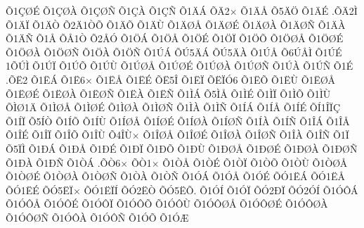 {^^d51^^c7^^d8^^c9
^^d51^^c7^^d8^^c0
^^d51^^c7^^d8^^d1
^^d51^^c7^^c0
^^d51^^c7^^d1
^^d51^^c4^^c1
^^d5^^c42^^d7
^^d51^^c4^^c5
^^d55^^c4^^d6
^^d51^^c4^^c9
.^^d5^^c42^^cc
^^d51^^c4^^cf
^^d51^^c4^^d2
^^d52^^c41^^d2^^d5
^^d51^^c4^^d5
^^d51^^c4^^d9
^^d51^^c4^^d8^^c5
^^d51^^c4^^d8^^c9
^^d51^^c4^^d8^^c0
^^d51^^c4^^d8^^d1
^^d51^^c4^^c0
^^d51^^c4^^d1
^^d51^^c5
^^d5^^c51^^d2
^^d52^^c5^^d3
^^d51^^d6^^c1
^^d51^^d6^^c5
^^d51^^d6^^c9
^^d51^^d6^^cf
^^d51^^d6^^d5
^^d51^^d6^^d8^^c5
^^d51^^d6^^d8^^c9
^^d51^^d6^^d8^^c0
^^d51^^d6^^d8^^d1
^^d51^^d6^^c0
^^d51^^d6^^d1
^^d51^^da^^c1
^^d5^^da5^^c4^^c1
^^d5^^da5^^c4^^c0
^^d51^^da^^c5
^^d56^^da^^c5^^cc
^^d51^^da^^c9
1^^d5^^da^^cc
^^d51^^da^^cf
^^d51^^da^^d5
^^d51^^da^^d9
^^d51^^da^^d8^^c5
^^d51^^da^^d8^^c9
^^d51^^da^^d8^^c0
^^d51^^da^^d8^^d1
^^d51^^da^^c0
^^d51^^da^^d1
^^d51^^c9
.^^d5^^cb2
^^d51^^cb^^c1
^^d51^^cb6^^d7
^^d51^^cb^^c5
^^d51^^cb^^c9
^^d5^^cb5^^ce
^^d51^^cb^^cf
^^d5^^cb^^cf^^d36
^^d51^^cb^^d5
^^d51^^cb^^d9
^^d51^^cb^^d8^^c5
^^d51^^cb^^d8^^c9
^^d51^^cb^^d8^^c0
^^d51^^cb^^d8^^d1
^^d51^^cb^^c0
^^d51^^cb^^d1
^^d51^^cc^^c1
^^d55^^cc^^c5
^^d51^^cc^^c9
^^d51^^cc^^cf
^^d51^^cc^^d5
^^d51^^cc^^d9
^^d5^^cc^^d81^^c4
^^d51^^cc^^d8^^c5
^^d51^^cc^^d8^^c9
^^d51^^cc^^d8^^c0
^^d51^^cc^^d8^^d1
^^d51^^cc^^c0
^^d51^^cc^^d1
^^d51^^cd^^c1
^^d51^^cd^^c5
^^d51^^cd^^c9
^^d5^^cd1^^ce^^cf^^c7
^^d51^^cd^^cf
^^d55^^cd^^d2
^^d51^^cd^^d5
^^d51^^cd^^d9
^^d51^^cd^^d8^^c5
^^d51^^cd^^d8^^c9
^^d51^^cd^^d8^^c0
^^d51^^cd^^d8^^d1
^^d51^^cd^^c0
^^d51^^cd^^d1
^^d51^^ce^^c1
^^d51^^ce^^c5
^^d51^^ce^^c9
^^d51^^ce^^cf
^^d51^^ce^^d5
^^d51^^ce^^d9
^^d54^^ce^^d9^^d7
^^d51^^ce^^d8^^c5
^^d51^^ce^^d8^^c9
^^d51^^ce^^d8^^c0
^^d51^^ce^^d8^^d1
^^d51^^ce^^c0
^^d51^^ce^^d1
^^d51^^cf
^^d55^^cf^^cc
^^d51^^d0^^c1
^^d51^^d0^^c5
^^d51^^d0^^c9
^^d51^^d0^^cf
^^d51^^d0^^d5
^^d51^^d0^^d9
^^d51^^d0^^d8^^c5
^^d51^^d0^^d8^^c9
^^d51^^d0^^d8^^c0
^^d51^^d0^^d8^^d1
^^d51^^d0^^c0
^^d51^^d0^^d1
^^d51^^d2^^c1
.^^d5^^d26^^d7
^^d5^^d21^^d7
^^d51^^d2^^c5
^^d51^^d2^^c9
^^d51^^d2^^cf
^^d51^^d2^^d5
^^d51^^d2^^d9
^^d51^^d2^^d8^^c5
^^d51^^d2^^d8^^c9
^^d51^^d2^^d8^^c0
^^d51^^d2^^d8^^d1
^^d51^^d2^^c0
^^d51^^d2^^d1
^^d51^^d3^^c1
^^d51^^d3^^c5
^^d51^^d3^^c9
^^d5^^d31^^cb^^c1
^^d5^^d31^^cb^^c5
^^d5^^d31^^cb^^c9
^^d5^^d35^^cb^^cf^^d7
^^d5^^d31^^cb^^cf^^cd
^^d5^^d32^^cb^^d2
^^d5^^d35^^cb^^d5.
^^d51^^d3^^cd
^^d51^^d3^^cf
^^d5^^d32^^d0^^cf
^^d5^^d32^^d3^^cd
^^d51^^d3^^d4^^c1
^^d51^^d3^^d4^^c5
^^d51^^d3^^d4^^c9
^^d51^^d3^^d4^^cf
^^d51^^d3^^d4^^d5
^^d51^^d3^^d4^^d9
^^d51^^d3^^d4^^d8^^c5
^^d51^^d3^^d4^^d8^^c9
^^d51^^d3^^d4^^d8^^c0
^^d51^^d3^^d4^^d8^^d1
^^d51^^d3^^d4^^c0
^^d51^^d3^^d4^^d1
^^d51^^d3^^d5
^^d51^^d3^^c6
}
